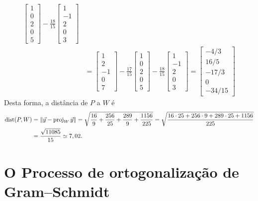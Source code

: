 \documentclass[../livro.tex]{subfiles}  %
\begin{document}
\begin{example}
\[\begin{split}
\begin{bmatrix}
1 \\ 0 \\ 2 \\ 0 \\ 5
\end{bmatrix} - \frac{18}{15}
\begin{bmatrix}
1 \\ -1 \\ 2 \\ 0 \\ 3
\end{bmatrix} \\
   & = \begin{bmatrix}
1 \\ 2 \\ -1 \\ 0 \\ 7
\end{bmatrix} - \frac{17}{15}
\begin{bmatrix}
1 \\ 0 \\ 2 \\ 0 \\ 5
\end{bmatrix} - \frac{18}{15}
\begin{bmatrix}
1 \\ -1 \\ 2 \\ 0 \\ 3
\end{bmatrix} =
\begin{bmatrix}
-4/3 \\ 16/5 \\ -17/3 \\ 0 \\ -34/15
\end{bmatrix}
\end{split}
\] Desta forma, a distância de $P$ a $W$ é
\[
\begin{split}
\operatorname{dist} (P,W) & = \|\vec{y} - \operatorname{proj}_{W} \vec{y}\| = \sqrt{\frac{16}{9} + \frac{256}{25} + \frac{289}{9} + \frac{1156}{225}} = \sqrt{\frac{ 16\cdot 25 + 256\cdot 9 + 289 \cdot 25 + 1156}{225}} \\
           & = \frac{ \sqrt{11085} }{15} \simeq 7,02.
\end{split}
\]
\end{example}




\section{O Processo de ortogonalização de Gram--Schmidt}
\end{document}
